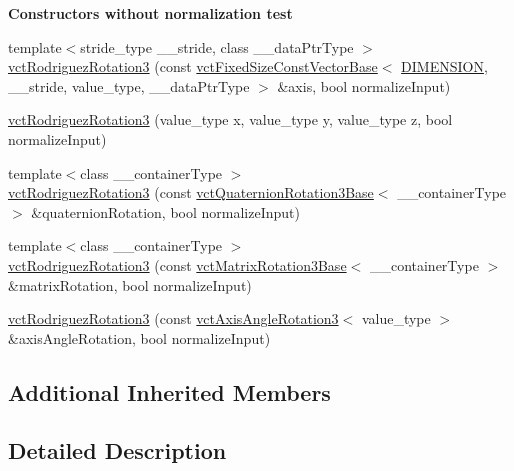 \begin{Indent}{\bf Constructors without normalization test}
{\begin{DoxyItemize}
\end{DoxyItemize}}\begin{DoxyCompactItemize}
\item 
{\footnotesize template$<$stride\-\_\-type \-\_\-\-\_\-stride, class \-\_\-\-\_\-data\-Ptr\-Type $>$ }\\\hyperlink{classvct_rodriguez_rotation3_a9d9bc07dcca5a5a11d07c04e2438750e}{vct\-Rodriguez\-Rotation3} (const \hyperlink{classvct_fixed_size_const_vector_base}{vct\-Fixed\-Size\-Const\-Vector\-Base}$<$ \hyperlink{classvct_rodriguez_rotation3_a7a58a7aa413585bc569bcf1f22656ae3a8bdaaaae91a14fa58479067f59ed9145}{D\-I\-M\-E\-N\-S\-I\-O\-N}, \-\_\-\-\_\-stride, value\-\_\-type, \-\_\-\-\_\-data\-Ptr\-Type $>$ \&axis, bool normalize\-Input)
\item 
\hyperlink{classvct_rodriguez_rotation3_a7d27c72e51b6e646bc59bb4dab64b0e3}{vct\-Rodriguez\-Rotation3} (value\-\_\-type x, value\-\_\-type y, value\-\_\-type z, bool normalize\-Input)
\item 
{\footnotesize template$<$class \-\_\-\-\_\-container\-Type $>$ }\\\hyperlink{classvct_rodriguez_rotation3_aea99f0057e9249cf2ce11745ef70ce32}{vct\-Rodriguez\-Rotation3} (const \hyperlink{classvct_quaternion_rotation3_base}{vct\-Quaternion\-Rotation3\-Base}$<$ \-\_\-\-\_\-container\-Type $>$ \&quaternion\-Rotation, bool normalize\-Input)
\item 
{\footnotesize template$<$class \-\_\-\-\_\-container\-Type $>$ }\\\hyperlink{classvct_rodriguez_rotation3_a7a20e70d05cb83743a38f483f6cd26f7}{vct\-Rodriguez\-Rotation3} (const \hyperlink{classvct_matrix_rotation3_base}{vct\-Matrix\-Rotation3\-Base}$<$ \-\_\-\-\_\-container\-Type $>$ \&matrix\-Rotation, bool normalize\-Input)
\item 
\hyperlink{classvct_rodriguez_rotation3_a7c6a9382f2e3547ee7e740bfb105d05e}{vct\-Rodriguez\-Rotation3} (const \hyperlink{classvct_axis_angle_rotation3}{vct\-Axis\-Angle\-Rotation3}$<$ value\-\_\-type $>$ \&axis\-Angle\-Rotation, bool normalize\-Input)
\end{DoxyCompactItemize}
\end{Indent}
\subsection*{Additional Inherited Members}


\subsection{Detailed Description}
